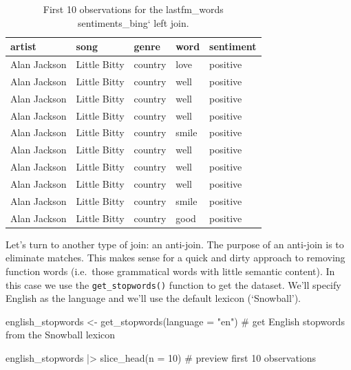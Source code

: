 \documentclass[
  letterpaper,
]{latex/krantz}
\newenvironment{Shaded}{\begin{snugshade}}{\end{snugshade}}
\newcommand{\AttributeTok}[1]{\textcolor[rgb]{0.40,0.45,0.13}{#1}}
\newcommand{\CommentTok}[1]{\textcolor[rgb]{0.37,0.37,0.37}{#1}}
\newcommand{\DecValTok}[1]{\textcolor[rgb]{0.68,0.00,0.00}{#1}}
\newcommand{\FunctionTok}[1]{\textcolor[rgb]{0.28,0.35,0.67}{#1}}
\newcommand{\NormalTok}[1]{\textcolor[rgb]{0.00,0.23,0.31}{#1}}
\newcommand{\OtherTok}[1]{\textcolor[rgb]{0.00,0.23,0.31}{#1}}
\newcommand{\SpecialCharTok}[1]{\textcolor[rgb]{0.37,0.37,0.37}{#1}}
\newcommand{\StringTok}[1]{\textcolor[rgb]{0.13,0.47,0.30}{#1}}
\begin{document}
\begin{table}
\caption{First 10 observations for the lastfm\_words sentiments\_bing` left join.}\tabularnewline

\centering
\begin{tabular}{lllll}
\toprule
artist & song & genre & word & sentiment\\
\midrule
Alan Jackson & Little Bitty & country & love & positive\\
Alan Jackson & Little Bitty & country & well & positive\\
Alan Jackson & Little Bitty & country & well & positive\\
Alan Jackson & Little Bitty & country & well & positive\\
Alan Jackson & Little Bitty & country & smile & positive\\
\addlinespace
Alan Jackson & Little Bitty & country & well & positive\\
Alan Jackson & Little Bitty & country & well & positive\\
Alan Jackson & Little Bitty & country & well & positive\\
Alan Jackson & Little Bitty & country & smile & positive\\
Alan Jackson & Little Bitty & country & good & positive\\
\bottomrule
\end{tabular}
\end{table}

Let's turn to another type of join: an anti-join. The purpose of an
anti-join is to eliminate matches. This makes sense for a quick and
dirty approach to removing function words (i.e.~those grammatical words
with little semantic content). In this case we use the
\texttt{get\_stopwords()} function to get the dataset. We'll specify
English as the language and we'll use the default lexicon (`Snowball').

\begin{Shaded}
\begin{Highlighting}[]
\NormalTok{english\_stopwords }\OtherTok{\textless{}{-}} 
  \FunctionTok{get\_stopwords}\NormalTok{(}\AttributeTok{language =} \StringTok{"en"}\NormalTok{) }\CommentTok{\# get English stopwords from the Snowball lexicon}

\NormalTok{english\_stopwords }\SpecialCharTok{|\textgreater{}} 
  \FunctionTok{slice\_head}\NormalTok{(}\AttributeTok{n =} \DecValTok{10}\NormalTok{) }\CommentTok{\# preview first 10 observations}
\end{Highlighting}
\end{Shaded}
\end{document}
